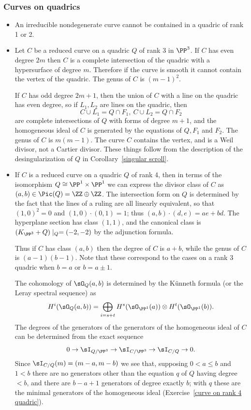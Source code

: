 \subsubsection{Curves on quadrics}\label{curves on quadrics}
\begin{itemize}

\item An irreducible nondegenerate  curve cannot be contained in a quadric of rank 1 or 2.

\item Let $C$ be a reduced curve on a quadric $Q$ of rank 3 in $\PP^{3}$. 
If $C$ has even degree $2m$ then $C$ is a complete intersection
of the quadric with a hypersurface of degree $m$. Therefore if the curve is smooth it cannot contain the vertex of the quadric. The genus of $C$ is $(m-1)^{2}$.

If $C$ has odd degree $2m+1$, then the union of $C$ with a line on the quadric has even degree,
so if $L_{1}, L_{2}$ are lines on the quadric, then 
$$
C\cup L_{1} = Q\cap F_{1}, \ C\cup L_{2} = Q\cap F_{2}
$$
are complete intersections of $Q$ with forms of degree $m+1$, and the homogeneous ideal of $C$ is generated by the equations
of $Q,F_{1}$ and $F_{2}$. The genus of $C$ is $m(m-1)$. The curve $C$ contains the vertex, and is a 
Weil divisor, not a Cartier divisor. These things follow from the description of the desingularization
of $Q$ in Corollary~\ref{singular scroll}.

\item If $C$ is a reduced curve on a quadric $Q$ of rank 4, then in terms of the isomorphism
$Q \cong \PP^{1}\times \PP^{1}$ we can express the divisor class of $C$ as $(a,b)\in \Pic(Q) = \ZZ\oplus \ZZ$.
The intersection form on $Q$ is determined by the fact that the lines of a ruling are all linearly equivalent,
so that $(1,0)^{2} =0$ and $(1,0)\cdot (0,1) = 1$; thus $(a,b)\cdot (d,e) = ae+bd$. The hyperplane section
has class $(1,1)$, and the canonical class is $(K_{\PP^{3}}+Q)\mid_{Q} = (-2,-2)$ by the adjunction formula. 

Thus
if $C$ has class $(a,b)$ then the degree of $C$ is $a+b$, while the genus of $C$ is $(a-1)(b-1)$. Note that these correspond
to the cases on a rank 3 quadric when $b = a$ or $b = a\pm 1$. 


The cohomology of $\sO_{Q}(a,b)$ is determined by the K\"unneth formula (or the Leray spectral sequence) as
$$
H^{i}(\sO_{Q}(a,b)) = \bigoplus_{i = s+t}H^{s}(\sO_{\PP^{1}}(a))\otimes H^{t}(\sO_{\PP^{1}}(b)).
$$
The degrees of the generators of the generators of the homogeneous ideal of $C$ can be determined from the exact sequence
$$
0\to \sI_{Q/\PP^{3}} \to \sI_{C/\PP^{3}} \to \sI_{C/Q} \to 0.
$$
Since $ \sI_{C/Q} (m) = (m-a,m-b)$ we see that, supposing $0<a\leq b$ and $1<b$
there are no generators other than the equation $q$ of $Q$ having degree $<b$, and there are 
$b-a+1$ generators of degree exactly $b$; with $q$ these are the minimal generators of the homogeneous
ideal (Exercise~\ref{curve on rank 4 quadric}).
\end{itemize}


